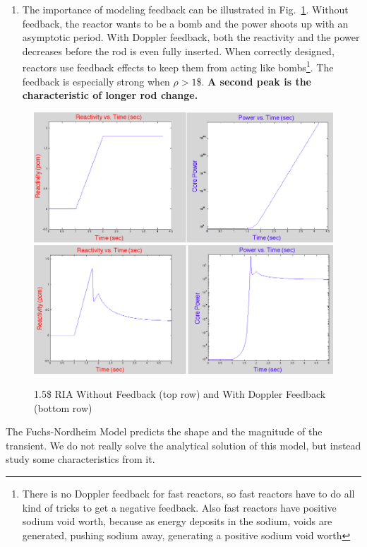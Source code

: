 \documentclass{school-22.211-notes}
\begin{document}
\begin{enumerate}
\item The importance of modeling feedback can be illustrated in Fig.~\ref{feedback}. Without feedback, the reactor wants to be a bomb and the power shoots up with an asymptotic period. With Doppler feedback, both the reactivity and the power decreases before the rod is even fully inserted. When correctly designed, reactors use feedback effects to keep them from acting like bombs\footnote{There is no Doppler feedback for fast reactors, so fast reactors have to do all kind of tricks to get a negative feedback. Also fast reactors have positive sodium void worth, because as energy deposits in the sodium, voids are generated, pushing sodium away, generating a positive sodium void worth}. The feedback is especially strong when $\rho > 1$\$. \textbf{A second peak is the characteristic of longer rod change.} 
\end{enumerate} 
  \begin{figure}[ht]
    \centering
    \includegraphics[width=6in]{images/pke/feedback1.png}
    \\
    \includegraphics[width=6in]{images/pke/feedback2.png}
    \caption{1.5\$ RIA Without Feedback (top row) and With Doppler Feedback (bottom row)}\label{feedback}
  \end{figure}



\clearpage
{}
The Fuchs-Nordheim Model predicts the shape and the magnitude of the transient. We do not really solve the analytical solution of this model, but instead study some characteristics from it. 
\end{document}
